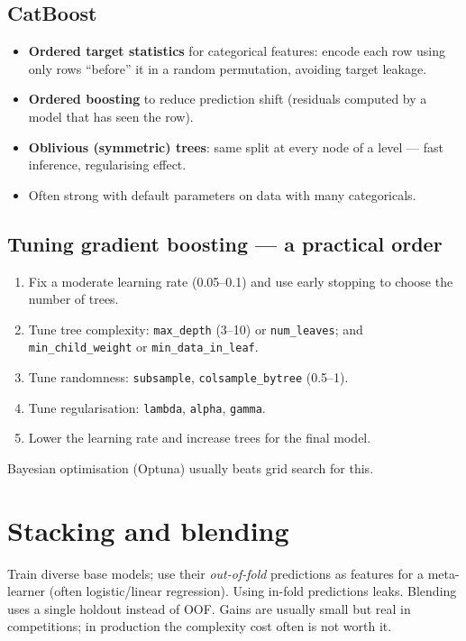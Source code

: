 \subsection{CatBoost}
\begin{itemize}
  \item \textbf{Ordered target statistics} for categorical features: encode each row using only rows ``before'' it in a random permutation, avoiding target leakage.
  \item \textbf{Ordered boosting} to reduce prediction shift (residuals computed by a model that has seen the row).
  \item \textbf{Oblivious (symmetric) trees}: same split at every node of a level --- fast inference, regularising effect.
  \item Often strong with default parameters on data with many categoricals.
\end{itemize}

\subsection{Tuning gradient boosting --- a practical order}
\begin{enumerate}
  \item Fix a moderate learning rate (0.05--0.1) and use early stopping to choose the number of trees.
  \item Tune tree complexity: \texttt{max\_depth} (3--10) or \texttt{num\_leaves}; and \texttt{min\_child\_weight} or \texttt{min\_data\_in\_leaf}.
  \item Tune randomness: \texttt{subsample}, \texttt{colsample\_bytree} (0.5--1).
  \item Tune regularisation: \texttt{lambda}, \texttt{alpha}, \texttt{gamma}.
  \item Lower the learning rate and increase trees for the final model.
\end{enumerate}
Bayesian optimisation (Optuna) usually beats grid search for this.

\section{Stacking and blending}
Train diverse base models; use their \emph{out-of-fold} predictions as features for a meta-learner (often logistic/linear regression). Using in-fold predictions leaks. Blending uses a single holdout instead of OOF. Gains are usually small but real in competitions; in production the complexity cost often is not worth it.

